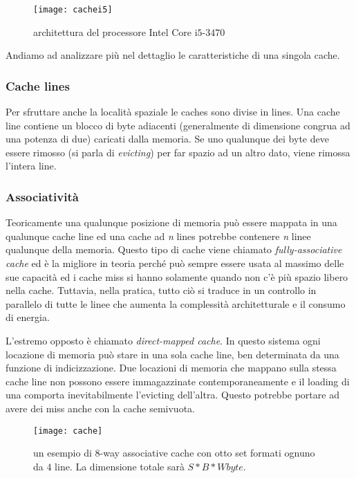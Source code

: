 			\begin{figure}
				\begin{center}
					\texttt{[image: cachei5]}
					\caption{architettura del processore Intel Core i$5$-$3470$}
					\label{fig:cachei5}
				\end{center}
			\end{figure}
			
			Andiamo ad analizzare più nel dettaglio le caratteristiche di una singola cache\cite{ge2016survey,yarom2014flush+}.
			
			\subsubsection{Cache lines}
				Per sfruttare anche la località spaziale le caches sono divise in lines. Una cache line contiene un blocco di byte adiacenti (generalmente di dimensione congrua ad una potenza di due) caricati dalla memoria. Se uno qualunque dei byte deve essere rimosso (si parla di \emph{evicting}) per far spazio ad un altro dato, viene rimossa l'intera line.
				
			\subsubsection{Associatività}
				Teoricamente una qualunque posizione di memoria può essere mappata in una qualunque cache line ed una cache ad \emph{n} lines potrebbe contenere \emph{n} linee qualunque della memoria. Questo tipo di cache viene chiamato \emph{fully-associative cache} ed è la migliore in teoria perché può sempre essere usata al massimo delle sue capacità ed i cache miss si hanno solamente quando non c'è più spazio libero nella cache. Tuttavia, nella pratica, tutto ciò si traduce in un controllo in parallelo di tutte le linee che aumenta la complessità architetturale e il consumo di energia.
				
				L'estremo opposto è chiamato \emph{direct-mapped cache}. In questo sistema ogni locazione di memoria può stare in una sola cache line, ben determinata da una funzione di indicizzazione. Due locazioni di memoria che mappano sulla stessa cache line non possono essere immagazzinate contemporaneamente e il loading di una comporta inevitabilmente l'evicting dell'altra. Questo potrebbe portare ad avere dei miss anche con la cache semivuota.
				
				\begin{figure}
					\begin{center}
						\texttt{[image: cache]}
						\caption[$8$-way associative cache]{un esempio di $8$-way associative cache con otto set formati ognuno da $4$ line. La dimensione totale sarà $S*B*W byte$.}
						\label{fig:cache}
					\end{center}
				\end{figure}
				
